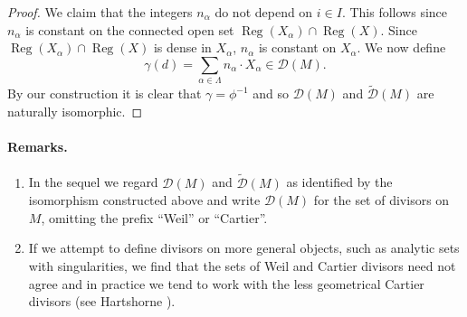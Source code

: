 \begin{proof}
We claim that the integers $n_\alpha$ do not depend on $i\in I$. This follows since $n_\alpha$ is constant on the connected open set $\operatorname{Reg}(X_\alpha)\cap\operatorname{Reg}(X)$. Since $\operatorname{Reg}(X_\alpha)\cap\operatorname{Reg}(X)$ is dense in $X_\alpha$, $n_\alpha$ is constant on $X_\alpha$. We now define
\[
\gamma(d)=\sum_{\alpha\in\Lambda}n_\alpha\cdot X_\alpha\in\mathcal D(M).
\]
By our construction it is clear that $\gamma=\phi^{-1}$ and so $\mathcal D(M)$ and $\widetilde{\mathcal D}(M)$ are naturally isomorphic.
\end{proof}

\paragraph*{Remarks.}
\begin{enumerate}
\item In the sequel we regard $\mathcal D(M)$ and $\widetilde{\mathcal D}(M)$ as identified by the isomorphism constructed above and write $\mathcal D(M)$ for the set of divisors on $M$, omitting the prefix ``Weil'' or ``Cartier''.
\item If we attempt to define divisors on more general objects, such as analytic sets with singularities, we find that the sets of Weil and Cartier divisors need not agree and in practice we tend to work with the less geometrical Cartier divisors (see Hartshorne \cite[pages 140--142]{bib:I:hartshorne-r:2}).
\end{enumerate}


